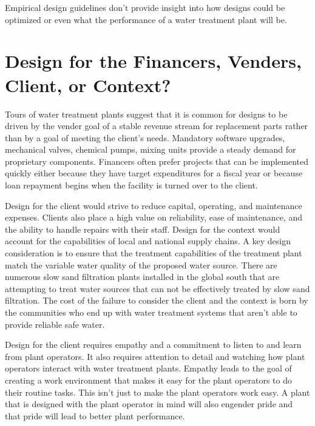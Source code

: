 \documentclass[letterpaper,10pt,english]{sphinxmanual}
\begin{document}
Empirical design guidelines don’t provide insight into how designs could be optimized or even what the performance of a water treatment plant will be.


\section{Design for the Financers, Venders, Client, or Context?}
\label{\detokenize{Introduction/Introduction:design-for-the-financers-venders-client-or-context}}\label{\detokenize{Introduction/Introduction:heading-design-for-the-context}}
Tours of water treatment plants suggest that it is common for designs to be driven by the vender goal of a stable revenue stream for replacement parts rather than by a goal of meeting the client’s needs. Mandatory software upgrades, mechanical valves, chemical pumps, mixing units provide a steady demand for proprietary components. Financers often prefer projects that can be implemented quickly either because they have target expenditures for a fiscal year or because loan repayment begins when the facility is turned over to the client.

Design for the client would strive to reduce capital, operating, and maintenance expenses. Clients also place a high value on reliability, ease of maintenance, and the ability to handle repairs with their staff. Design for the context would account for the capabilities of local and national supply chains. A key design consideration is to ensure that the treatment capabilities of the treatment plant match the variable water quality of the proposed water source. There are numerous slow sand filtration plants installed in the global south that are attempting to treat water sources that can not be effectively treated by slow sand filtration. The cost of the failure to consider the client and the context is born by the communities who end up with water treatment systems that aren’t able to provide reliable safe water.

Design for the client requires empathy and a commitment to listen to and learn from plant operators. It also requires attention to detail and watching how plant operators interact with water treatment plants. Empathy leads to the goal of creating a work environment that makes it easy for the plant operators to do their routine tasks. This isn’t just to make the plant operators work easy. A plant that is designed with the plant operator in mind will also engender pride and that pride will lead to better plant performance.
\end{document}

